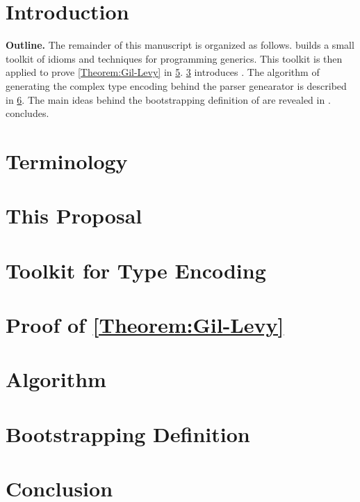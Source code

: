 \documentclass[a4paper,USenglish]{lipics}
\author{Anonymized for the submission}
\begin{document}
\maketitle
\begin{abstract}
	 
\end{abstract}



\section{Introduction}


\textbf{Outline.} 
The remainder of this manuscript is organized as follows.
 builds a small toolkit of idioms and techniques for programming generics.  
This toolkit is then applied to prove \cref{Theorem:Gil-Levy} 
  in \cref{Section:proof}.
\cref{Section:proposal} introduces \Self.
The algorithm of generating the complex type encoding behind the parser genearator 
is described in \cref{Section:algorithm}. 
The main ideas behind the bootstrapping definition of \Self 
  are revealed in . 
 concludes. 

\section{Terminology}
\label{Section:terminology}
%

\section{This Proposal}
\label{Section:proposal}
%

\section{Toolkit for Type Encoding}
\label{Section:toolkit}


\section{Proof of \cref{Theorem:Gil-Levy}}
\label{Section:proof}
%

\section{Algorithm}
\label{Section:algorithm}
%

\section{Bootstrapping Definition}
\label{Section:bootstrapping}
%

\section{Conclusion}
\label{Section:zz}
%

\small
%

\end{document}
